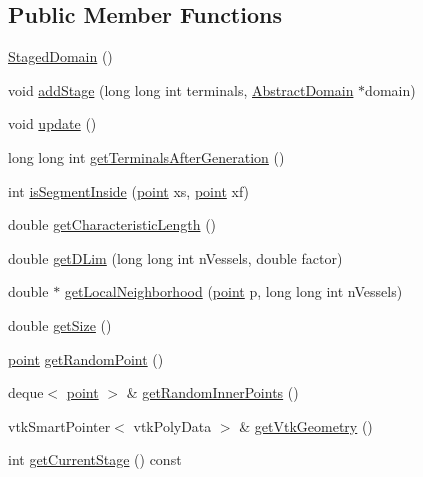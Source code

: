 \subsection*{Public Member Functions}
\begin{DoxyCompactItemize}
\item 
\hyperlink{class_staged_domain_a48d3fc928f1c52c13adc66761fd45353}{Staged\+Domain} ()
\item 
void \hyperlink{class_staged_domain_a3b206c2ba98d6fca73dd2b76689f9742}{add\+Stage} (long long int terminals, \hyperlink{class_abstract_domain}{Abstract\+Domain} $\ast$domain)
\item 
void \hyperlink{class_staged_domain_abacd2429b605ac8ae9c94701485f4df0}{update} ()
\item 
long long int \hyperlink{class_staged_domain_ac179c1e1d0a2aac78093bd71d083811f}{get\+Terminals\+After\+Generation} ()
\item 
int \hyperlink{class_staged_domain_a2f13523c9e014efd270df926aabdbc76}{is\+Segment\+Inside} (\hyperlink{structpoint}{point} xs, \hyperlink{structpoint}{point} xf)
\item 
double \hyperlink{class_staged_domain_aec389e04bcd549140b29dbc9c56cf29b}{get\+Characteristic\+Length} ()
\item 
double \hyperlink{class_staged_domain_a4bb50d4e92dc81e0c87aa0b4190138b3}{get\+D\+Lim} (long long int n\+Vessels, double factor)
\item 
double $\ast$ \hyperlink{class_staged_domain_ad8107b681fcba3794ea4cd9b1a5a2edd}{get\+Local\+Neighborhood} (\hyperlink{structpoint}{point} p, long long int n\+Vessels)
\item 
double \hyperlink{class_staged_domain_a807d7b1c56b5a6ccce593513baebf3b1}{get\+Size} ()
\item 
\hyperlink{structpoint}{point} \hyperlink{class_staged_domain_a90178baeab98fe08850977e7924c2780}{get\+Random\+Point} ()
\item 
deque$<$ \hyperlink{structpoint}{point} $>$ \& \hyperlink{class_staged_domain_a5a5398712e064cbd706f701c8294bbad}{get\+Random\+Inner\+Points} ()
\item 
vtk\+Smart\+Pointer$<$ vtk\+Poly\+Data $>$ \& \hyperlink{class_staged_domain_a69530fd545f217410433367a7e219fbf}{get\+Vtk\+Geometry} ()
\item 
int \hyperlink{class_staged_domain_a9483ed1fc5df7381f739ade92c92444f}{get\+Current\+Stage} () const 
\end{DoxyCompactItemize}
